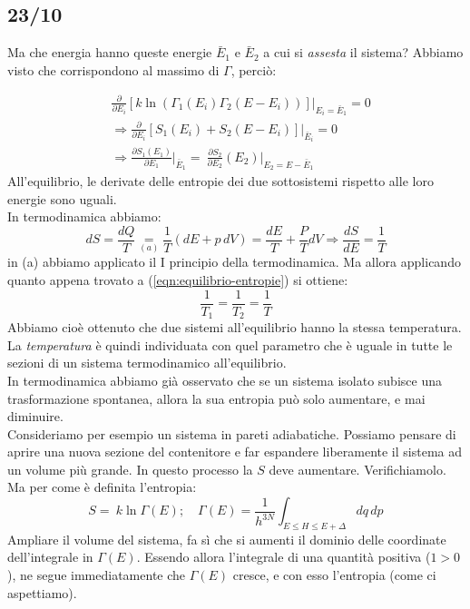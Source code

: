 \documentclass[../MeccanicaStatistica.tex]{subfiles}
\begin{document}
\subsection{23/10}
Ma che energia hanno queste energie $\bar{E}_1$ e $\bar{E}_2$ a cui si \textit{assesta} il sistema? Abbiamo visto che corrispondono al massimo di $\Gamma$, perciò:

\begin{align}
&\frac{\partial}{\partial E_i}\left [k\ln(\Gamma_1(E_i)\Gamma_2(E-E_i))\right]\big|_{E_i = \bar{E}_1} = 0\nonumber \\
&\Rightarrow \frac{\partial}{\partial E_i}\left[S_1(E_i)+S_2(E-E_i)\right]\big|_{\bar{E}_i} = 0\nonumber \\
&\Rightarrow \frac{\partial S_1(E_1)}{\partial E_1}\big|_{\bar{E}_1} =\ \frac{\partial S_2}{\partial E_2}(E_2)\big|_{E_2=E-\bar{E}_1}
\label{eqn:equilibrio-entropie}
\end{align}
All'equilibrio, le derivate delle entropie dei due sottosistemi rispetto alle loro energie sono uguali.\\
In termodinamica abbiamo:
\[
dS = \frac{dQ}{T} \underset{(a)}{=} \frac{1}{T}(dE + p\,dV) =\frac{dE}{T}+\frac{P}{T}dV\Rightarrow \frac{dS}{dE} = \frac{1}{T}
\]
in (a) abbiamo applicato il I principio della termodinamica. Ma allora applicando quanto appena trovato a (\ref{eqn:equilibrio-entropie}) si ottiene:
\[
\frac{1}{T_1}=\frac{1}{T_2}=\frac{1}{T}
\]
Abbiamo cioè ottenuto che due sistemi all'equilibrio hanno la stessa temperatura.\\
La \textit{temperatura} è quindi individuata con quel parametro che è uguale in tutte le sezioni di un sistema termodinamico all'equilibrio.\\
In termodinamica abbiamo già osservato che se un sistema isolato subisce una trasformazione spontanea, allora la sua entropia può solo aumentare, e mai diminuire.\\
Consideriamo per esempio un sistema in pareti adiabatiche. Possiamo pensare di aprire una nuova sezione del contenitore e far espandere liberamente il sistema ad un volume più grande. In questo processo la $S$ deve aumentare. Verifichiamolo.\\
Ma per come è definita l'entropia:
\[
S =\ k\ln\Gamma(E); \quad \Gamma(E)=\frac{1}{h^{3N}}\int_{E\leq H \leq E+\Delta}dq\,dp
\]
Ampliare il volume del sistema, fa sì che si aumenti il dominio delle coordinate dell'integrale in $\Gamma(E)$. Essendo allora l'integrale di una quantità positiva ($1>0$), ne segue immediatamente che $\Gamma(E)$ cresce, e con esso l'entropia (come ci aspettiamo).
\end{document}
